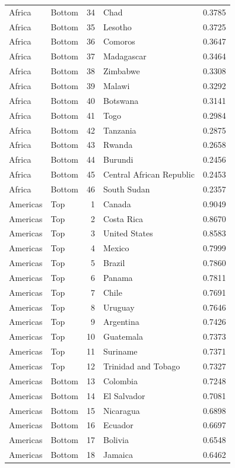 \begin{table}
\begin{tabular}{llrlr}
Africa & Bottom & 34 & Chad & 0.3785 \\
Africa & Bottom & 35 & Lesotho & 0.3725 \\
Africa & Bottom & 36 & Comoros & 0.3647 \\
Africa & Bottom & 37 & Madagascar & 0.3464 \\
Africa & Bottom & 38 & Zimbabwe & 0.3308 \\
Africa & Bottom & 39 & Malawi & 0.3292 \\
Africa & Bottom & 40 & Botswana & 0.3141 \\
Africa & Bottom & 41 & Togo & 0.2984 \\
Africa & Bottom & 42 & Tanzania & 0.2875 \\
Africa & Bottom & 43 & Rwanda & 0.2658 \\
Africa & Bottom & 44 & Burundi & 0.2456 \\
Africa & Bottom & 45 & Central African Republic & 0.2453 \\
Africa & Bottom & 46 & South Sudan & 0.2357 \\
Americas & Top & 1 & Canada & 0.9049 \\
Americas & Top & 2 & Costa Rica & 0.8670 \\
Americas & Top & 3 & United States & 0.8583 \\
Americas & Top & 4 & Mexico & 0.7999 \\
Americas & Top & 5 & Brazil & 0.7860 \\
Americas & Top & 6 & Panama & 0.7811 \\
Americas & Top & 7 & Chile & 0.7691 \\
Americas & Top & 8 & Uruguay & 0.7646 \\
Americas & Top & 9 & Argentina & 0.7426 \\
Americas & Top & 10 & Guatemala & 0.7373 \\
Americas & Top & 11 & Suriname & 0.7371 \\
Americas & Top & 12 & Trinidad and Tobago & 0.7327 \\
Americas & Bottom & 13 & Colombia & 0.7248 \\
Americas & Bottom & 14 & El Salvador & 0.7081 \\
Americas & Bottom & 15 & Nicaragua & 0.6898 \\
Americas & Bottom & 16 & Ecuador & 0.6697 \\
Americas & Bottom & 17 & Bolivia & 0.6548 \\
Americas & Bottom & 18 & Jamaica & 0.6462 \\

\end{tabular}
\end{table}
